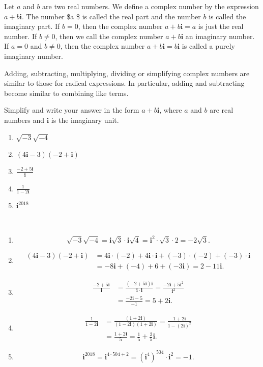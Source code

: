 \documentclass[en,12pt]{elegantbook}
\providecommand{\tightlist}{%
  \setlength{\itemsep}{0pt}\setlength{\parskip}{0pt}}
\newcommand{\ii}{\mathbf{i}}
\let\BeginKnitrBlock\begin \let\EndKnitrBlock\end
\begin{document}
Let \(a\) and \(b\) are two real numbers. We define a complex number by the expression \(a+b \ii\).
The number \$a \$ is called the real part and the number \(b\) is called the imaginary part. If \(b=0\),
then the complex number \(a+b\ii=a\) is just the real number.
If \(b\neq 0\), then we call the complex number \(a+b\ii\) an imaginary number.
If \(a=0\) and \(b\neq 0\), then the complex number \(a+b\ii=b\ii\) is called a purely imaginary number.

Adding, subtracting, multiplying, dividing or simplifying complex numbers are similar to those for radical expressions. In particular, adding and subtracting become similar to combining like terms.

\BeginKnitrBlock{example}
\protect\hypertarget{exm:unnamed-chunk-94}{}{\label{exm:unnamed-chunk-94} }
Simplify and write your answer in the form \(a+b\ii\), where \(a\) and \(b\) are real numbers and \(\ii\) is the imaginary unit.

\begin{enumerate}
\def\labelenumi{\arabic{enumi}.}
\tightlist
\item
  \(\sqrt{-3}\sqrt{-4}\)
\item
  \((4\ii-3)(-2+\ii)\)
\item
  \(\frac{-2+5\ii}{\ii}\)
\item
  \(\frac{1}{1-2\ii}\)
\item
  \(\ii^{2018}\)
\end{enumerate}
\EndKnitrBlock{example}

\BeginKnitrBlock{solution}
{}\\

\begin{enumerate}
\def\labelenumi{\arabic{enumi}.}
\tightlist
\item
  \[
    \sqrt{-3}\sqrt{-4}=\ii\sqrt{3}\cdot\ii\sqrt{4}=\ii^2\cdot \sqrt3\cdot 2=-2\sqrt{3}.
  \]
\item
  \[
    \begin{split}
        (4\ii-3)(-2+\ii)&=4\ii\cdot(-2)+4\ii\cdot \ii+(-3)\cdot(-2)+(-3)\cdot\ii \\
        &=-8\ii+(-4)+6+(-3\ii)=2-11\ii.
    \end{split}
  \]
\item
  \[
    \begin{split}
        \frac{-2+5\ii}{\ii}&=\frac{(-2+5\ii)\ii}{\ii\cdot \ii}=\frac{-2\ii+5\ii^2}{\ii^2}\\
        &=\frac{-2\ii-5}{-1}=5+2\ii.
    \end{split}
  \]
\item
  \[
    \begin{split}
        \frac{1}{1-2\ii}&=\frac{(1+2\ii)}{(1-2\ii)(1+2\ii)}=\frac{1+2\ii}{1-(2\ii)^2}\\
        &=\frac{1+2\ii}{5}=\frac{1}{5}+\frac{2}{5}\ii.
    \end{split}
  \]
\item
  \[
    \ii^{2018}=\ii^{4\cdot 504+2}=(\ii^4)^{504}\cdot \ii^2=-1.
  \]
\end{enumerate}
\EndKnitrBlock{solution}
\end{document}
